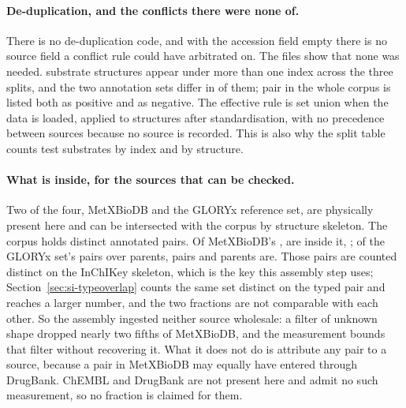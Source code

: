 \documentclass[journal=jcisd8,manuscript=suppinfo,layout=onecolumn]{achemso}
\begin{document}
\paragraph{De-duplication, and the conflicts there were none of.} There is no de-duplication
code, and with the accession field empty there is no source field a conflict rule could have
arbitrated on. The files show that none was needed. \numAssemblyDuplicated{} substrate
structures appear under more than one index across the three splits, and the two annotation sets
differ in \numAssemblyDisagreementsWord{} of them; \numAssemblyBothwaysWord{}
pair in the whole corpus is listed both as positive and as negative. The effective rule is set
union when the data is loaded, applied to structures after standardisation, with no precedence
between sources because no source is recorded. This is also why the split table counts
\numAssemblyTestids{} test substrates by index and \numAssemblyTeststructures{} by structure.

\paragraph{What is inside, for the sources that can be checked.} Two of the four, MetXBioDB
and the GLORYx reference set, are physically present here and can be intersected with the
corpus by structure skeleton. The corpus holds \numAssemblyCorpuspairs{} distinct annotated
pairs. Of MetXBioDB's \numAssemblyMetxpairs{}, \numAssemblyMetxinside{} are inside it,
\numAssemblyMetxshare{}; of the GLORYx set's \numAssemblyGloryxpairs{} pairs over
\numAssemblyGloryxparents{} parents, \numAssemblyGloryxpairsinside{} pairs and
\numAssemblyGloryxparentsinside{} parents are. Those pairs are counted distinct on the InChIKey
skeleton, which is the key this assembly step uses; Section~\ref{sec:si-typeoverlap} counts the same
set distinct on the typed pair and reaches a larger number, and the two fractions are not
comparable with each other. So the assembly ingested neither source
wholesale: a filter of unknown shape dropped nearly two fifths of MetXBioDB, and the measurement
bounds that filter without recovering it. What it does not do is attribute any pair to a source,
because a pair in MetXBioDB may equally have entered through DrugBank. ChEMBL and DrugBank are
not present here and admit no such measurement, so no fraction is claimed for them.
\end{document}
